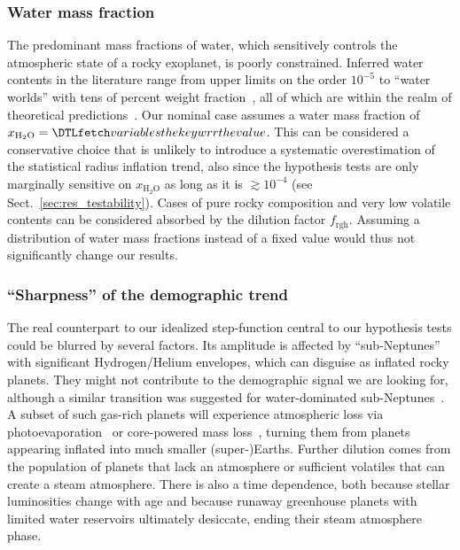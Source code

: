\documentclass[twocolumn]{aastex631}
\begin{document}
\subsubsection{Water mass fraction}
The predominant mass fractions of water, which sensitively controls the atmospheric state of a rocky exoplanet, is poorly constrained.
Inferred water contents in the literature range from upper limits on the order $10^{-5}$ to ``water worlds'' with tens of percent weight fraction~\citep[e.g.,][]{Rogers2010,Unterborn2018,Mousis2020,Agol2021,Luque2022}, all of which are within the realm of theoretical predictions~\citep{Mulders2015b,Sato2016,Jin2018,Bitsch2019b,Venturini2020,Emsenhuber2021b,Schlecker2021}.
Our nominal case assumes a water mass fraction of $x_\mathrm{H_2O} = \var{wrr}$.
This can be considered a conservative choice that is unlikely to introduce a systematic overestimation of the statistical radius inflation trend, also since the hypothesis tests are only marginally sensitive on $x_\mathrm{H_2O}$ as long as it is $\gtrsim 10^{-4}$ (see Sect.~\ref{sec:res_testability}).
Cases of pure rocky composition and very low volatile contents can be considered absorbed by the dilution factor $f_\mathrm{rgh}$.
Assuming a distribution of water mass fractions instead of a fixed value would thus not significantly change our results.

\subsubsection{``Sharpness'' of the demographic trend}
The real counterpart to our idealized step-function central to our hypothesis tests could be blurred by several factors.
Its amplitude is affected by ``sub-Neptunes'' with significant Hydrogen/Helium envelopes, which can disguise as inflated rocky planets.
They might not contribute to the demographic signal we are looking for, although a similar transition was suggested for water-dominated sub-Neptunes~\citep{Pierrehumbert2022}.
A subset of such gas-rich planets will experience atmospheric loss via photoevaporation~\citep{Owen2013} or core-powered mass loss~\citep{Ginzburg2018}, turning them from planets appearing inflated into much smaller \mbox{(super-)Earths}.
Further dilution comes from the population of planets that lack an atmosphere or sufficient volatiles that can create a steam atmosphere.
There is also a time dependence, both because stellar luminosities change with age and because runaway greenhouse planets with limited water reservoirs ultimately desiccate, ending their steam atmosphere phase.
\end{document}
